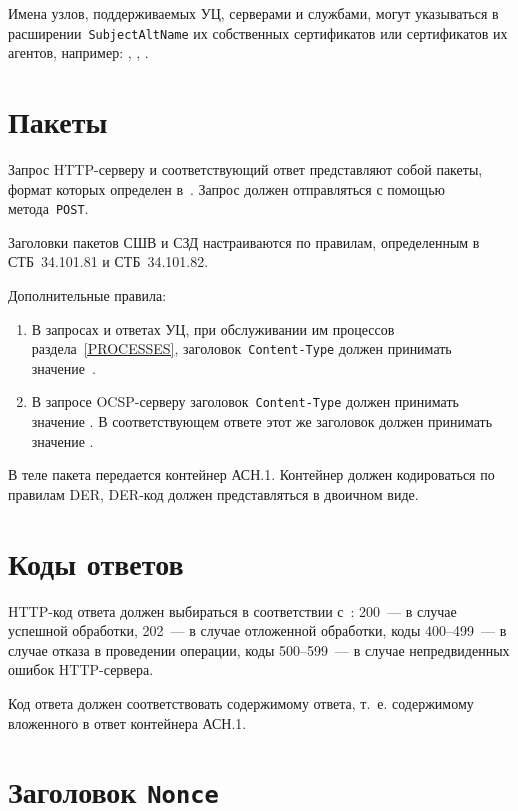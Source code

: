 Имена узлов, поддерживаемых УЦ, серверами и службами, могут указываться в 
расширении~\texttt{SubjectAltName} их собственных сертификатов или 
сертификатов их агентов, например: 
, 
, 
.

\section{Пакеты}\label{TRANSPORT.Packets}

Запрос HTTP-серверу и соответствующий ответ представляют собой пакеты,
формат которых определен в~\cite{HTTP}.
%
Запрос должен отправляться с помощью метода~\texttt{POST}.

Заголовки пакетов СШВ и СЗД настраиваются по правилам, 
определенным в СТБ~34.101.81 и СТБ~34.101.82. 

Дополнительные правила:
\begin{enumerate}
\item
В запросах и ответах УЦ, при обслуживании им процессов раздела~\ref{PROCESSES},
заголовок~\texttt{Content-Type} должен принимать значение~.

\item
В запросе OCSP-серверу заголовок~\texttt{Content-Type} 
должен принимать значение .
В соответствующем ответе этот же заголовок должен принимать значение 
. 
\end{enumerate}

В теле пакета передается контейнер АСН.1.
Контейнер должен кодироваться по правилам DER, DER-код должен 
представляться в двоичном виде.

\section{Коды ответов}\label{TRANSPORT.Codes}

HTTP-код ответа должен выбираться в соответствии с~\cite{HTTP}: 
200~--- в случае успешной обработки, 
202~--- в случае отложенной обработки,
коды 400--499~--- в случае отказа в проведении операции,
коды 500--599~--- в случае непредвиденных ошибок HTTP-сервера.

Код ответа должен соответствовать содержимому ответа, т.~е.
содержимому вложенного в ответ контейнера АСН.1.

\section{Заголовок \texttt{Nonce}}\label{TRANSPORT.Nonce}

